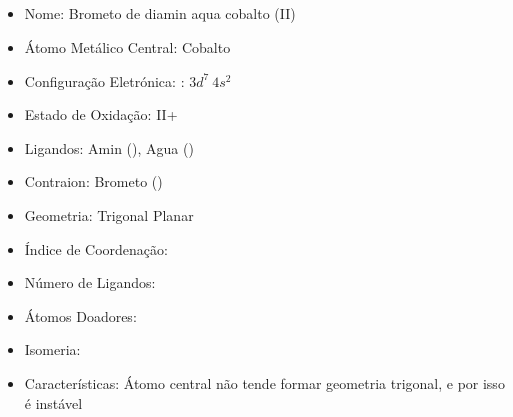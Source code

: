 \documentclass[12pt]{article}
\begin{document}
\noindent\begin{minipage}{\textwidth}
	
	\subsection{}
	\begin{itemize}
   \item Nome:
   	Brometo de diamin aqua cobalto (II)
   	
   
   \item Átomo Metálico Central:
   	Cobalto
   	
   \item Configuração Eletrónica:
   	\ch{[Ar]}: $3d^7\ 4s^2$
   
   \item Estado de Oxidação:
   	II+
   
   \item Ligandos:
   	Amin (), Agua ()
   
   \item Contraion:
   	Brometo ()
   
   \item Geometria:
   	Trigonal Planar
   
   \item Índice de Coordenação: 
   
   
   \item Número de Ligandos:
   
   
   \item Átomos Doadores:
   
   
   \item Isomeria:
   	
   
   \item Características:
   	Átomo central não tende formar geometria trigonal, e por isso é instável
   
	\end{itemize}
	
\end{minipage}
\end{document}
